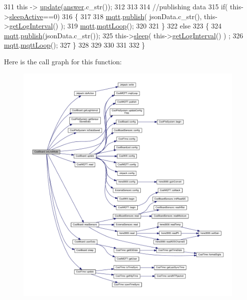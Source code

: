 \begin{DoxyCode}
311     \textcolor{keyword}{this} -> \hyperlink{classCoolBoard_a8612756d3f73198cdde857a66f0fe690}{update}(\hyperlink{classCoolBoard_a7b835fafd449e5282f7f91d787a2dc15}{answer}.c\_str());
312     
313 
314     \textcolor{comment}{//publishing data   }
315     \textcolor{keywordflow}{if}( this->\hyperlink{classCoolBoard_a0a51b2287139f66c738101fb53139230}{sleepActive}==0)    
316     \{   
317         
318         \hyperlink{classCoolBoard_a2399f44d7c23c1149a335cb3b46d90f1}{mqtt}.\hyperlink{classCoolMQTT_ace977b3e90ab14b1199fe5c4fb0a13ec}{publish}( jsonData.c\_str(), this->\hyperlink{classCoolBoard_aaa24480b273fc095a1356a589c333781}{getLogInterval}() );
319         \hyperlink{classCoolBoard_a2399f44d7c23c1149a335cb3b46d90f1}{mqtt}.\hyperlink{classCoolMQTT_aa5eaae967b562b62cbcf2b8d81f6e5d5}{mqttLoop}();
320     
321     \}
322     \textcolor{keywordflow}{else}
323     \{
324         \hyperlink{classCoolBoard_a2399f44d7c23c1149a335cb3b46d90f1}{mqtt}.\hyperlink{classCoolMQTT_ace977b3e90ab14b1199fe5c4fb0a13ec}{publish}(jsonData.c\_str());      
325         this->\hyperlink{classCoolBoard_a5d0c8ff93b615efd676be432de9f164a}{sleep}( this->\hyperlink{classCoolBoard_aaa24480b273fc095a1356a589c333781}{getLogInterval}() ) ;
326         \hyperlink{classCoolBoard_a2399f44d7c23c1149a335cb3b46d90f1}{mqtt}.\hyperlink{classCoolMQTT_aa5eaae967b562b62cbcf2b8d81f6e5d5}{mqttLoop}();
327     \}
328 
329     
330         
331         
332 \}
\end{DoxyCode}
Here is the call graph for this function\+:
\nopagebreak
\begin{figure}[H]
\begin{center}
\leavevmode
\includegraphics[width=350pt]{classCoolBoard_aa0bbc4bc605e35618d18e68795c61363_cgraph}
\end{center}
\end{figure}
\mbox{\label{classCoolBoard_a486507b8f0981d3cc671ed31c2145755}} 
